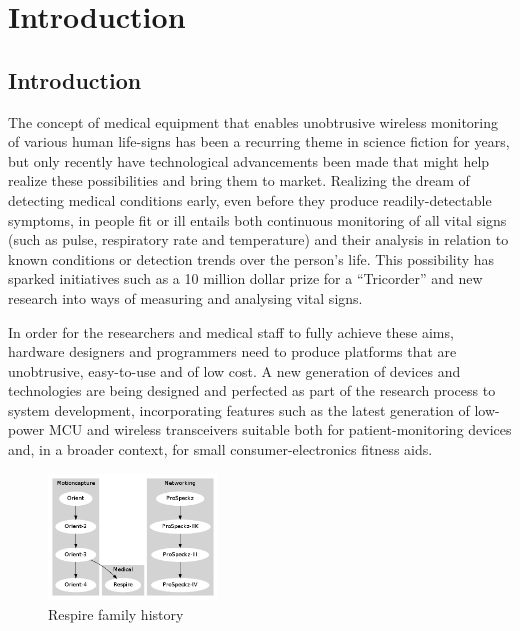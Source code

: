 
\chapter{Introduction}

\section{Introduction}

The concept of medical equipment that enables unobtrusive wireless monitoring of various human
life-signs has been a recurring theme in science fiction for years, but only recently have
technological advancements been made that might help realize these possibilities and bring them to
market. Realizing the dream of detecting medical conditions early, even before they produce readily-detectable
symptoms, in people fit or ill entails both continuous monitoring of all vital signs (such as
pulse, respiratory rate and temperature) and their analysis in relation to known conditions or
detection trends over the person's life. This possibility has sparked initiatives such as a 10 million
dollar prize for a ``Tricorder'' and new research into ways of measuring and analysing vital
signs.


In order for the researchers and medical staff to fully achieve these aims, hardware designers and
programmers need to produce platforms that are unobtrusive, easy-to-use and of low cost. A new
generation of devices and technologies are being designed and perfected as part of the research
process to system development, incorporating features such as the latest generation of low-power
\ac{MCU} and wireless transceivers suitable both for patient-monitoring devices
and, in a broader context, for small  consumer-electronics fitness aids.

\begin{figure}
  \vspace{-10pt}
  \begin{center}
    \includegraphics[width=0.4\textwidth, keepaspectratio=true]{images/respire_family_history.png}
  \end{center}
  \caption{Respire family history}
  \vspace{-10pt}
\end{figure}

